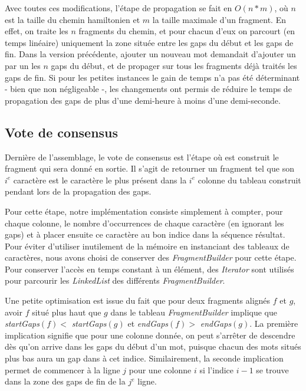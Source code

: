 \documentclass{article}
\begin{document}
Avec toutes ces modifications, l'étape de propagation se fait en $O(n*m)$, où $n$ est la taille du chemin hamiltonien et $m$ la taille maximale d'un fragment. En effet, on traite les $n$ fragments du chemin, et pour chacun d'eux on parcourt (en temps linéaire) uniquement la zone située entre les gaps du début et les gaps de fin. Dans la version précédente, ajouter un nouveau mot demandait d'ajouter un par un les $n$ gaps du début, et de propager sur tous les fragments déjà traités les gaps de fin. Si pour les petites instances le gain de temps n'a pas été déterminant - bien que non négligeable -, les changements ont permis de réduire le temps de propagation des gaps de plus d'une demi-heure à moins d'une demi-seconde.

\newpage

\subsection{Vote de consensus}

Dernière de l'assemblage, le vote de consensus est l'étape où est construit le fragment qui sera donné en sortie. Il s'agit de retourner un fragment tel que son $i^e$ caractère est le caractère le plus présent dans la $i^e$ colonne du tableau construit pendant lors de la propagation des gaps.

Pour cette étape, notre implémentation consiste simplement à compter, pour chaque colonne, le nombre d’occurrences de chaque caractère (en ignorant les gaps) et à placer ensuite ce caractère au bon indice dans la séquence résultat.
Pour éviter d'utiliser inutilement de la mémoire en instanciant des tableaux de caractères, nous avons choisi de conserver des \textit{FragmentBuilder} pour cette étape. Pour conserver l'accès en temps constant à un élément, des \textit{Iterator} sont utilisés pour parcourir les \textit{LinkedList} des différents \textit{FragmentBuilder}.

Une petite optimisation est issue du fait que pour deux fragments alignés $f$ et $g$, avoir $f$ situé plus haut que $g$ dans le tableau \textit{FragmentBuilder} implique que \textit{startGaps}$(f) < $  \textit{startGaps}$(g)$ et \textit{endGaps}$(f) > $  \textit{endGaps}$(g)$. La première implication signifie que pour une colonne donnée, on peut s'arrêter de descendre dès qu'on arrive dans les gaps du début d'un mot, puisque chacun des mots situés plus bas aura un gap dans à cet indice. Similairement, la seconde implication permet de commencer à la ligne $j$ pour une colonne $i$ si l'indice $i-1$ se trouve dans la zone des gaps de fin de la $j^e$ ligne. 
\end{document}
